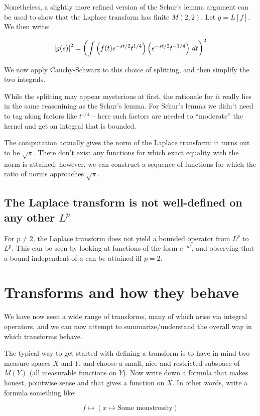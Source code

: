 \documentclass[a4paper]{amsart}
\begin{document}
Nonetheless, a slightly more refined version of the Schur's lemma
argument can be used to show that the Laplace transform has finite
$M(2,2)$. Let $g = L[f]$. We then write:

$$\left|g(s)\right|^2 = \left( \int \left(f(t) e^{-st/2} t^{1/4}\right)\left(e^{-st/2}t^{-1/4}\right)\, dt \right)^2$$

We now apply Cauchy-Schwarz to this choice of splitting, and then
simplify the two integrals.

While the splitting may appear mysterious at first, the rationale for
it really lies in the same reasonining as the Schur's lemma. For
Schur's lemma we didn't need to tag along factors like $t^{1/4}$ --
here such factors are needed to ``moderate'' the kernel and get an
integral that is bounded.

The computation actually gives the norm of the Laplace transform: it
turns out to be $\sqrt{\pi}$. There don't exist any functions for
which exact equality with the norm is attained; however, we can construct a sequence of functions for which the ratio of norms approaches $\sqrt{\pi}$.

\subsection{The Laplace transform is not well-defined on any other $L^p$}

For $p \ne 2$, the Laplace transform does not yield a bounded operator
from $L^p$ to $L^p$. This can be seen by looking at functions of the
form $e^{-at}$, and observing that a bound independent of $a$ can be
attained iff $p = 2$.

\section{Transforms and how they behave}

We have now seen a wide range of transforms, many of which arise via
integral operators, and we can now attempt to summarize/understand the
overall way in which transforms behave.

The typical way to get started with defining a transform is to have in
mind two measure spaces $X$ and $Y$, and choose a small, nice and
restricted subspace of $M(Y)$ (all measurable functions on $Y$). Now
write down a formula that makes honest, pointwise sense and that gives a function on $X$. In other words, write a formula something like:

$$f \mapsto \left( x \mapsto \text{Some monstrosity}\right)$$
\end{document}
